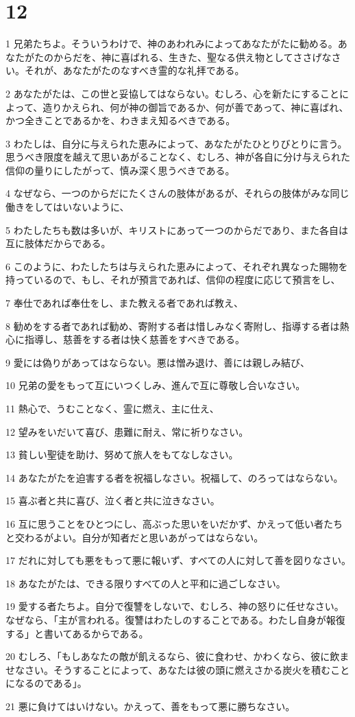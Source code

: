 \chapter{12}

\par 1 兄弟たちよ。そういうわけで、神のあわれみによってあなたがたに勧める。あなたがたのからだを、神に喜ばれる、生きた、聖なる供え物としてささげなさい。それが、あなたがたのなすべき霊的な礼拝である。
\par 2 あなたがたは、この世と妥協してはならない。むしろ、心を新たにすることによって、造りかえられ、何が神の御旨であるか、何が善であって、神に喜ばれ、かつ全きことであるかを、わきまえ知るべきである。
\par 3 わたしは、自分に与えられた恵みによって、あなたがたひとりびとりに言う。思うべき限度を越えて思いあがることなく、むしろ、神が各自に分け与えられた信仰の量りにしたがって、慎み深く思うべきである。
\par 4 なぜなら、一つのからだにたくさんの肢体があるが、それらの肢体がみな同じ働きをしてはいないように、
\par 5 わたしたちも数は多いが、キリストにあって一つのからだであり、また各自は互に肢体だからである。
\par 6 このように、わたしたちは与えられた恵みによって、それぞれ異なった賜物を持っているので、もし、それが預言であれば、信仰の程度に応じて預言をし、
\par 7 奉仕であれば奉仕をし、また教える者であれば教え、
\par 8 勧めをする者であれば勧め、寄附する者は惜しみなく寄附し、指導する者は熱心に指導し、慈善をする者は快く慈善をすべきである。
\par 9 愛には偽りがあってはならない。悪は憎み退け、善には親しみ結び、
\par 10 兄弟の愛をもって互にいつくしみ、進んで互に尊敬し合いなさい。
\par 11 熱心で、うむことなく、霊に燃え、主に仕え、
\par 12 望みをいだいて喜び、患難に耐え、常に祈りなさい。
\par 13 貧しい聖徒を助け、努めて旅人をもてなしなさい。
\par 14 あなたがたを迫害する者を祝福しなさい。祝福して、のろってはならない。
\par 15 喜ぶ者と共に喜び、泣く者と共に泣きなさい。
\par 16 互に思うことをひとつにし、高ぶった思いをいだかず、かえって低い者たちと交わるがよい。自分が知者だと思いあがってはならない。
\par 17 だれに対しても悪をもって悪に報いず、すべての人に対して善を図りなさい。
\par 18 あなたがたは、できる限りすべての人と平和に過ごしなさい。
\par 19 愛する者たちよ。自分で復讐をしないで、むしろ、神の怒りに任せなさい。なぜなら、「主が言われる。復讐はわたしのすることである。わたし自身が報復する」と書いてあるからである。
\par 20 むしろ、「もしあなたの敵が飢えるなら、彼に食わせ、かわくなら、彼に飲ませなさい。そうすることによって、あなたは彼の頭に燃えさかる炭火を積むことになるのである」。
\par 21 悪に負けてはいけない。かえって、善をもって悪に勝ちなさい。

